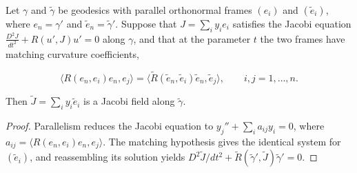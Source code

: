 \begin{lemma}
  \label{lem:dc-ch8-2-1-jacobi-transfer}


  Let $\gamma$ and $\tilde\gamma$ be geodesics with parallel orthonormal frames
  $(e_i)$ and $(\tilde e_i)$, where $e_n=\gamma'$ and
  $\tilde e_n=\tilde\gamma'$. Suppose that $J=\sum_i y_i e_i$ satisfies the Jacobi
  equation $\tfrac{D^2 J}{dt^2}+R(u',J)u'=0$ along $\gamma$, and that at the parameter
  $t$ the two frames have matching curvature coefficients,

  $$
  \langle R(e_n,e_i)e_n,e_j\rangle=\langle\tilde R(\tilde e_n,\tilde e_i)\tilde e_n,\tilde e_j\rangle,
  \qquad i,j=1,\dots,n.
  $$

  Then $\tilde J=\sum_i y_i\tilde e_i$ is a Jacobi field along $\tilde\gamma$.
\end{lemma}
\begin{proof}

\sketch
  Parallelism reduces the Jacobi equation to
  $y_j''+\sum_i a_{ij}y_i=0$, where
  $a_{ij}=\langle R(e_n,e_i)e_n,e_j\rangle$. The matching hypothesis gives the
  identical system for $(\tilde e_i)$, and reassembling its solution yields
  $D^2\tilde J/dt^2+\tilde R(\tilde\gamma',\tilde J)\tilde\gamma'=0$.
\end{proof}

